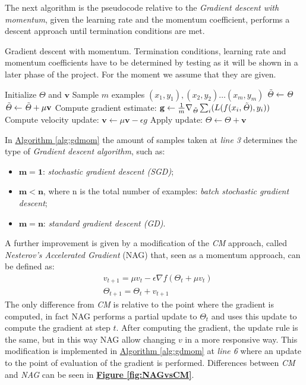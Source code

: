 The next algorithm is the pseudocode relative to the \textit{Gradient descent with momentum}, given the learning rate and the momentum coefficient, performs a descent approach until termination conditions are met.
\begin{algorithm}[H]
	\caption{Gradient descent with momentum. Termination conditions, learning rate and momentum coefficients have to be determined by testing as it will be shown in a later phase of the project. For the moment we assume that they are given.}
	\label{alg:gdmom}
	\begin{algorithmic}[1]
		\State Initialize $\mathit{\Theta}$ and $\mathbf{v}$
		\State Sample $m$ examples $(x_1,y_1), (x_2,y_2) \dots (x_m,y_m)$
		\State $\mathit{\Tilde{\Theta}} \leftarrow \mathit{\Theta}$
		\State $\mathit{\Tilde{\Theta}} \leftarrow \mathit{\Tilde{\Theta}} + \mu \mathbf{v}$
		\EndIf
		\State Compute gradient estimate: $\mathbf{g} \leftarrow \frac{1}{m}\nabla_{\mathit{\Tilde{\Theta}}}\sum_i(L(f(x_i,\mathit{\Tilde{\Theta}}),y_i))$
		\State Compute velocity update: $\mathbf{v} \leftarrow \mu \mathbf{v} - \epsilon g$
		\State Apply update: $\mathit{\Theta} \leftarrow \mathit{\Theta} + \mathbf{v}$
		\EndWhile
	\end{algorithmic}
\end{algorithm}
In \hyperref[alg:gdmom]{Algorithm \ref{alg:gdmom}} the amount of samples taken at \textit{line 3} determines the type of \textit{Gradient descent algorithm}, such as:
\begin{itemize}
    \item $\mathbf{m = 1}$: \textit{stochastic gradient descent (SGD)};
    \item $\mathbf{m < n}$, where n is the total number of examples: \textit{batch stochastic gradient descent};
    \item $\mathbf{m = n}$: \textit{standard gradient descent (GD)}.
\end{itemize}
A further improvement is given by a modification of the \textit{CM} approach, called \textit{Nesterov's Accelerated Gradient} (NAG) that, seen as a momentum approach, can be defined as:
\begin{align}
    \label{eq:nag}
    & v_{t+1} = \mu v_t - \epsilon\nabla f(\mathit{\Theta_t} + \mu v_t) \\ 
    & \mathit{\Theta_{t+1} = \mathit{\Theta_t} + v_{t+1}}
\end{align}
The only difference from \textit{CM }is relative to the point where the gradient is computed, in fact NAG performs a partial update to $\mathit{\Theta_t}$ and uses this update to compute the gradient at step $\mathit{t}$. After computing the gradient, the update rule is the same, but in this way NAG allow changing $v$ in a more responsive way. This modification is implemented in \hyperref[alg:gdmom]{Algorithm \ref{alg:gdmom}} at \textit{line 6} where an update to the point of evaluation of the gradient is performed. Differences between \textit{CM} and \textit{NAG} can be seen in \hyperref[fig:NAGvsCM]{\textbf{Figure \ref{fig:NAGvsCM}}}.
